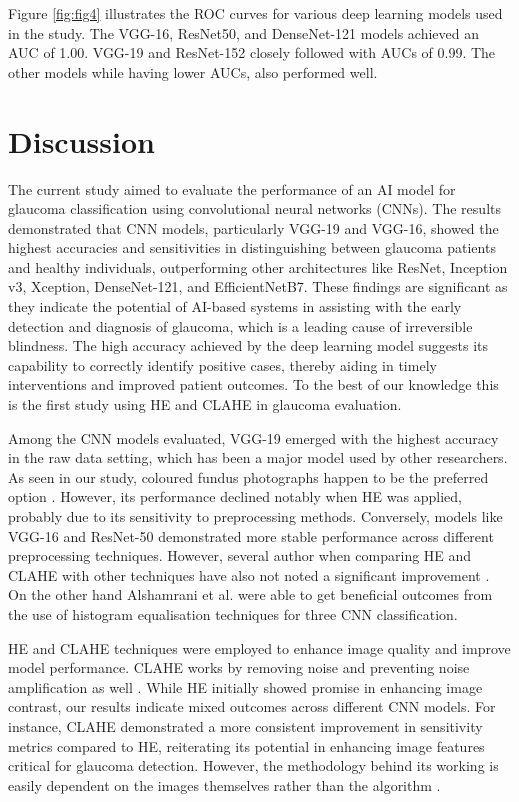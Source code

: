 \documentclass{article}
\begin{document}
Figure \ref{fig:fig4} illustrates the ROC curves for various deep learning models used in the study. The VGG-16, ResNet50, and DenseNet-121 models achieved an AUC of 1.00. VGG-19 and ResNet-152 closely followed with AUCs of 0.99. The other models while having lower AUCs, also performed well.

\section{Discussion}
The current study aimed to evaluate the performance of an AI model for glaucoma classification using convolutional neural networks (CNNs). The results demonstrated that CNN models, particularly VGG-19 and VGG-16, showed the highest accuracies and sensitivities in distinguishing between glaucoma patients and healthy individuals, outperforming other architectures like ResNet, Inception v3, Xception, DenseNet-121, and EfficientNetB7. These findings are significant as they indicate the potential of AI-based systems in assisting with the early detection and diagnosis of glaucoma, which is a leading cause of irreversible blindness. The high accuracy achieved by the deep learning model suggests its capability to correctly identify positive cases, thereby aiding in timely interventions and improved patient outcomes. To the best of our knowledge this is the first study using HE and CLAHE in glaucoma evaluation.

Among the CNN models evaluated, VGG-19 emerged with the highest accuracy in the raw data setting, which has been a major model used by other researchers. As seen in our study, coloured fundus photographs happen to be the preferred option \cite{b24, b25, b26}. However, its performance declined notably when HE was applied, probably due to its sensitivity to preprocessing methods. Conversely, models like VGG-16 and ResNet-50 demonstrated more stable performance across different preprocessing techniques. However, several author when comparing HE and CLAHE with other techniques have also not noted a significant improvement \cite{b27}. On the other hand Alshamrani et al. \cite{b28} were able to get beneficial outcomes from the use of histogram equalisation techniques for three CNN classification.

HE and CLAHE techniques were employed to enhance image quality and improve model performance. CLAHE works by removing noise and preventing noise amplification as well \cite{b29, b30}.  While HE initially showed promise in enhancing image contrast, our results indicate mixed outcomes across different CNN models. For instance, CLAHE demonstrated a more consistent improvement in sensitivity metrics compared to HE, reiterating its potential in enhancing image features critical for glaucoma detection. However, the methodology behind its working is easily dependent on the images themselves rather than the algorithm \cite{b31, b32}.
\end{document}
